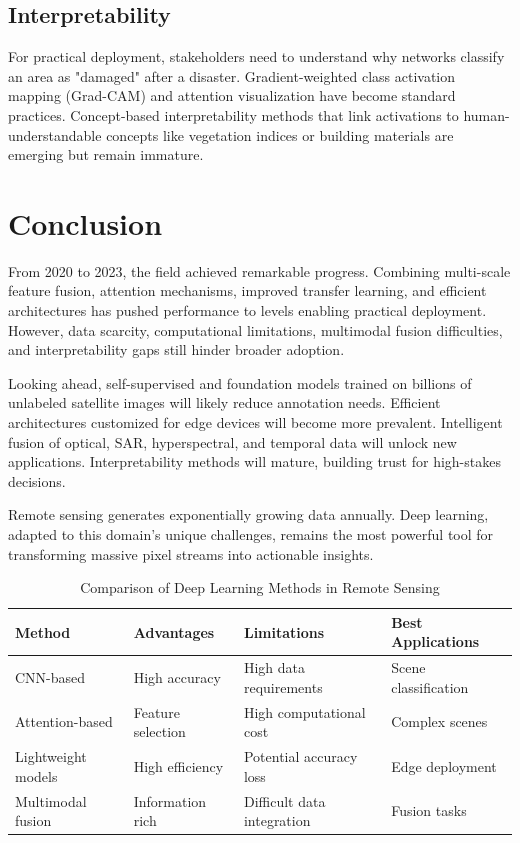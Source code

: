 \documentclass[12pt,a4paper]{article}
\begin{document}
\subsection{Interpretability}
For practical deployment, stakeholders need to understand why networks classify an area as "damaged" after a disaster. Gradient-weighted class activation mapping (Grad-CAM) and attention visualization have become standard practices. Concept-based interpretability methods that link activations to human-understandable concepts like vegetation indices or building materials are emerging but remain immature.

\section{Conclusion}
\label{sec:conclusion}
From 2020 to 2023, the field achieved remarkable progress. Combining multi-scale feature fusion, attention mechanisms, improved transfer learning, and efficient architectures has pushed performance to levels enabling practical deployment. However, data scarcity, computational limitations, multimodal fusion difficulties, and interpretability gaps still hinder broader adoption.

Looking ahead, self-supervised and foundation models trained on billions of unlabeled satellite images will likely reduce annotation needs. Efficient architectures customized for edge devices will become more prevalent. Intelligent fusion of optical, SAR, hyperspectral, and temporal data will unlock new applications. Interpretability methods will mature, building trust for high-stakes decisions.

Remote sensing generates exponentially growing data annually. Deep learning, adapted to this domain's unique challenges, remains the most powerful tool for transforming massive pixel streams into actionable insights.

\begin{table}[htbp]
\centering
\caption{Comparison of Deep Learning Methods in Remote Sensing}
\label{tab:comparison}
\begin{tabular}{@{}llll@{}}
\toprule
\textbf{Method} & \textbf{Advantages} & \textbf{Limitations} & \textbf{Best Applications} \\
\midrule
CNN-based & High accuracy & High data requirements & Scene classification \\
Attention-based & Feature selection & High computational cost & Complex scenes \\
Lightweight models & High efficiency & Potential accuracy loss & Edge deployment \\
Multimodal fusion & Information rich & Difficult data integration & Fusion tasks \\
\bottomrule
\end{tabular}
\end{table}
\end{document}
